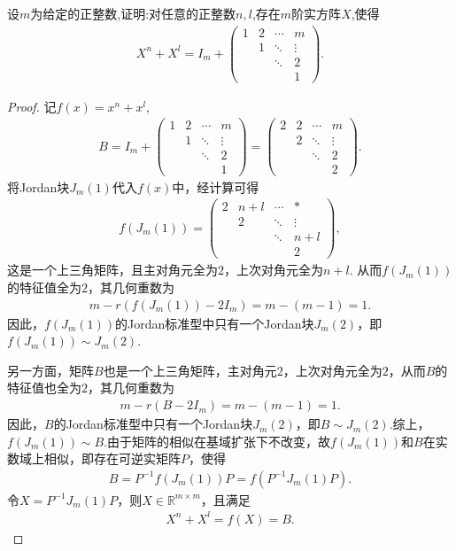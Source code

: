 \documentclass[../../main.tex]{subfiles}%
\begin{document}
\begin{example}
设$m$为给定的正整数,证明:对任意的正整数$n,l$,存在$m$阶实方阵$X$,使得
\begin{align*}
X^n + X^l = I_m + \begin{pmatrix}1 & 2 & \cdots & m\\ & 1 & \ddots & \vdots\\ & & \ddots & 2\\ & & & 1\end{pmatrix}.
\end{align*}
\end{example}
\begin{proof}

记$f(x) = x^n + x^l,$
\begin{align*}
B = I_m + \begin{pmatrix}1 & 2 & \cdots & m\\ & 1 & \ddots & \vdots\\ & & \ddots & 2\\ & & & 1\end{pmatrix} = \begin{pmatrix}2 & 2 & \cdots & m\\ & 2 & \ddots & \vdots\\ & & \ddots & 2\\ & & & 2\end{pmatrix}.
\end{align*}
将Jordan块$J_m(1)$代入$f(x)$中，经计算可得
\begin{align*}
f(J_m(1)) = \begin{pmatrix}2 & n+l & \cdots & *\\ & 2 & \ddots & \vdots\\ & & \ddots & n+l\\ & & & 2\end{pmatrix},
\end{align*}
这是一个上三角矩阵，且主对角元全为$2$，上次对角元全为$n+l$.
从而$f(J_m(1))$的特征值全为$2$，其几何重数为
\begin{align*}
m - r(f(J_m(1)) - 2I_m) = m - (m - 1) = 1.
\end{align*}
因此，$f(J_m(1))$的Jordan标准型中只有一个Jordan块$J_m(2)$，即$f(J_m(1)) \sim J_m(2)$.

另一方面，矩阵$B$也是一个上三角矩阵，主对角元$2$，上次对角元全为$2$，从而$B$的特征值也全为$2$，其几何重数为
\begin{align*}
m - r(B - 2I_m) = m - (m - 1) = 1.
\end{align*}
因此，$B$的Jordan标准型中只有一个Jordan块$J_m(2)$，即$B \sim J_m(2)$.综上，$f(J_m(1)) \sim B$.由于矩阵的相似在基域扩张下不改变，故$f(J_m(1))$和$B$在实数域上相似，即存在可逆实矩阵$P$，使得
\begin{align*}
B = P^{-1}f(J_m(1))P = f(P^{-1}J_m(1)P).
\end{align*}
令$X = P^{-1}J_m(1)P$，则$X \in \mathbb{R}^{m \times m}$，且满足
\begin{align*}
X^n + X^l = f(X) = B.
\end{align*}

\end{proof}
\end{document}
